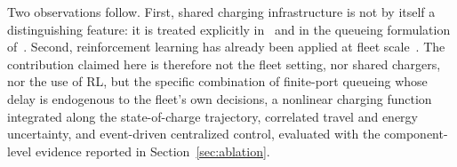 \documentclass[a4paper,fleqn]{cas-sc}
\begin{document}
Two observations follow. First, shared charging infrastructure is not by itself a distinguishing feature: it is treated explicitly in~\cite{https://doi.org/10.1111/itor.12620} and in the queueing formulation of~\cite{ziyan2025}. Second, reinforcement learning has already been applied at fleet scale~\citep{ALQAHTANI2022122626,10310266}. The contribution claimed here is therefore not the fleet setting, nor shared chargers, nor the use of RL, but the specific combination of finite-port queueing whose delay is endogenous to the fleet's own decisions, a nonlinear charging function integrated along the state-of-charge trajectory, correlated travel and energy uncertainty, and event-driven centralized control, evaluated with the component-level evidence reported in Section~\ref{sec:ablation}.

\end{document}
